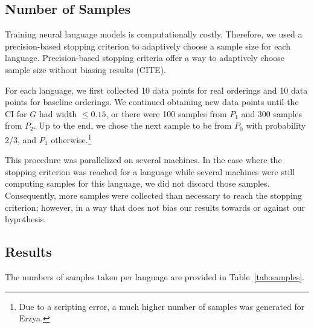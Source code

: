 \documentclass[11pt,letterpaper]{article}
\begin{document}
\subsection{Number of Samples}
Training neural language models is computationally costly.
Therefore, we used a precision-based stopping criterion to adaptively choose a sample size for each language.
Precision-based stopping criteria offer a way to adaptively choose sample size without biasing results (CITE).

For each language, we first collected 10 data points for real orderings and 10 data points for baseline orderings.
We continued obtaining new data points until the CI for $G$ had width $\leq 0.15$, or there were 100 samples from $P_1$ and 300 samples from $P_2$.
Up to the end, we chose the next sample to be from $P_0$ with probability 2/3, and $P_1$ otherwise.\footnote{Due to a scripting error, a much higher number of samples was generated for Erzya.}

This procedure was parallelized on several machines.
In the case where the stopping criterion was reached for a language while several machines were still computing samples for this language, we did not discard those samples.
Consequently, more samples were collected than necessary to reach the stopping criterion; however, in a way that does not bias our results towards or against our hypothesis.







\subsection{Results}

The numbers of samples taken per language are provided in Table~\ref{tab:samples}.
\end{document}
